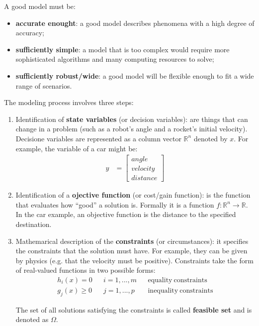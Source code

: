 A good model must be:
\begin{itemize}
    \item \textbf{accurate enought}: a good model describes phenomena with a high degree of accuracy;
    \item \textbf{sufficiently simple}: a model that is too complex would require more sophisticated algorithms and many computing resources to solve;
    \item \textbf{sufficiently robust/wide}: a good model will be flexible enough to fit a wide range of scenarios.
\end{itemize}

The modeling process involves three steps:
\begin{enumerate}
    \item Identification of \textbf{state variables} (or decision variables): are things that can change in a problem (such as a robot's angle and a rocket's initial velocity). Decisione variables are represented as a column vector \( \mathbb{R}^n \) denoted by \( x \). For example, the variable of a car might be:
    \begin{align*}
        y &= \begin{bmatrix}
                \mathit{angle} \\
                \mathit{velocity} \\
                \mathit{distance} 
             \end{bmatrix}
    \end{align*} 

    \item Identification of a \textbf{ojective function} (or cost/gain function): is the function that evaluates how ``good'' a solution is. Formally it is a function \( f : \mathbb{R}^n \rightarrow \mathbb{R} \). In the car example, an objective function is the distance to the specified destination.
    
    \item Mathemarical description of the \textbf{constraints} (or circumstances): it specifies the constraints that the solution must have. For example, they can be given by physics (e.g. that the velocity must be positive). 
    Constraints take the form of real-valued functions in two possible forms:
    \begin{align*}
        h_i(x) = 0 && i = 1, ..., m && \mathrm{equality~constraints} \\
        g_j(x) \geq 0 && j = 1, ..., p && \mathrm{inequality~constraints}
    \end{align*}

    The set of all solutions satisfying the constraints is called \textbf{feasible set} and is denoted as \( \Omega \).
\end{enumerate}

